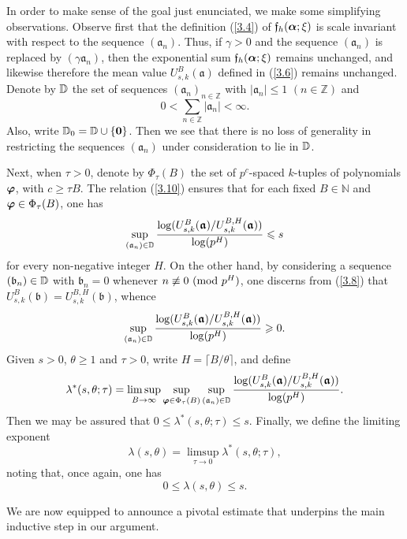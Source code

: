 \documentclass[12pt,reqno]{amsart}
\theoremstyle{definition}
\theoremstyle{remark}
\numberwithin{equation}{section}
\newcommand{\mmod}[1]{\,\,(\text{\rm mod}\,\,#1)}
\def\dbN{{\mathbb N}} \def\dbO{{\mathbb O}} \def\dbP{{\mathbb P}}
\def\dbZ{{\mathbb Z}}\def\dbQ{{\mathbb Q}}
\def\gra{{\mathfrak a}}\def\grA{{\mathfrak A}}\def\bfgra{{\boldsymbol \gra}}
\def\grb{{\mathfrak b}}\def\grB{{\mathfrak B}}\def\bfgrb{{\boldsymbol \grb}}
\def\grf{{\mathfrak f}}\def\grF{{\mathfrak F}}
\def\gam{{\gamma}} \def\Gam{{\Gamma}}
\def\tet{{\theta}} \def\bftet{{\boldsymbol \theta}}
\def\lam{{\lambda}} \def\Lam{{\Lambda}} \def\Lamtil{{\widetilde \Lambda}}
\def\le{\leqslant} \def\ge{\geqslant} \def\pleq{\preccurlyeq} \def\ple{\prec}
\begin{document}
\par In order to make sense of the goal just enunciated, we make some simplifying 
observations. Observe first that the definition (\ref{3.4}) of $\grf_h(\bfalp;\xi)$ is scale 
invariant with respect to the sequence $(\gra_n)$. Thus, if $\gam>0$ and the sequence 
$(\gra_n)$ is replaced by $(\gam \gra_n)$, then the exponential sum $\grf_h(\bfalp;\xi)$ 
remains unchanged, and likewise therefore the mean value $U_{s,k}^B(\bfgra)$ defined 
in (\ref{3.6}) remains unchanged. Denote by ${\mathbb D}$ the set of sequences 
$(\gra_n)_{n\in \dbZ}$ with $|\gra_n|\le 1$ $(n\in \dbZ)$ and 
$$0<\sum_{n\in \dbZ}|\gra_n|<\infty.$$
Also, write ${\mathbb D}_0={\mathbb D}\cup \{{\mathbf 0}\}$. Then we see that there is no loss of 
generality in restricting the sequences $(\gra_n)$ under consideration to lie in ${\mathbb D}$.\par

Next, when $\tau>0$, denote by $\Phi_\tau(B)$ the set of $p^c$-spaced $k$-tuples of 
polynomials ${\boldsymbol \varphi}$, with $c\ge \tau B$. The relation (\ref{3.10}) ensures that for 
each fixed $B\in \dbN$ and ${\boldsymbol \varphi}\in \Phi_\tau(B)$, one has
$$\sup_{(\gra_n)\in \dbD}\frac{\log (U_{s,k}^B(\bfgra)/U_{s,k}^{B,H}(\bfgra))}
{\log (p^H)}\le s$$
for every non-negative integer $H$. On the other hand, by considering a sequence 
$(\grb_n)\in \dbD$ with $\grb_n=0$ whenever $n\not\equiv 0\mmod{p^H}$, one discerns 
from (\ref{3.8}) that $U_{s,k}^B(\bfgrb)=U_{s,k}^{B,H}(\bfgrb)$, whence
$$\sup_{(\gra_n)\in \dbD}\frac{\log (U_{s,k}^B(\bfgra)/U_{s,k}^{B,H}(\bfgra))}
{\log (p^H)}\ge 0.$$
Given $s>0$, $\tet\ge 1$ and $\tau>0$, write $H=\lceil B/\tet\rceil$, and define
\begin{equation}\label{3.12}
\lam^*(s,\tet;\tau)=\limsup_{B\rightarrow \infty}\sup_{\bfvarphi\in \Phi_\tau(B)}
\sup_{(\gra_n)\in \dbD}\frac{\log (U_{s,k}^B(\bfgra)/U_{s,k}^{B,H}(\bfgra))}
{\log (p^H)}.
\end{equation}
Then we may be assured that $0\le \lam^*(s,\tet;\tau)\le s$. Finally, we define the limiting 
exponent
\begin{equation}\label{3.13}
\lam(s,\tet)=\limsup_{\tau\rightarrow 0}\lam^*(s,\tet;\tau),
\end{equation}
noting that, once again, one has
\begin{equation}\label{3.14}
0\le \lam(s,\tet)\le s.
\end{equation}

\par We are now equipped to announce a pivotal estimate that underpins the main inductive 
step in our argument.
\end{document}
